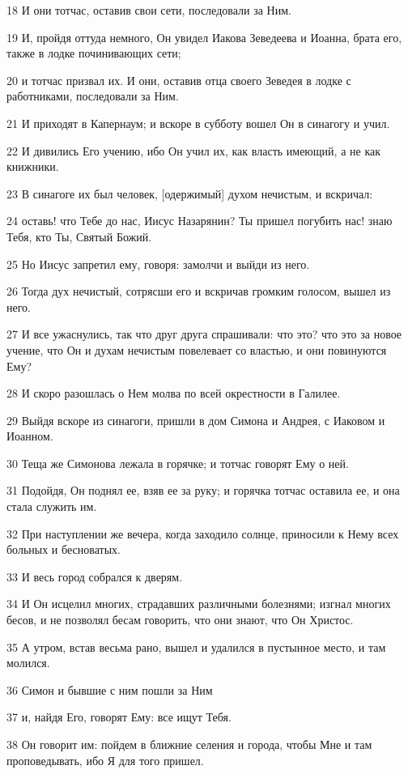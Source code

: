 \par 18 И они тотчас, оставив свои сети, последовали за Ним.
\par 19 И, пройдя оттуда немного, Он увидел Иакова Зеведеева и Иоанна, брата его, также в лодке починивающих сети;
\par 20 и тотчас призвал их. И они, оставив отца своего Зеведея в лодке с работниками, последовали за Ним.
\par 21 И приходят в Капернаум; и вскоре в субботу вошел Он в синагогу и учил.
\par 22 И дивились Его учению, ибо Он учил их, как власть имеющий, а не как книжники.
\par 23 В синагоге их был человек, [одержимый] духом нечистым, и вскричал:
\par 24 оставь! что Тебе до нас, Иисус Назарянин? Ты пришел погубить нас! знаю Тебя, кто Ты, Святый Божий.
\par 25 Но Иисус запретил ему, говоря: замолчи и выйди из него.
\par 26 Тогда дух нечистый, сотрясши его и вскричав громким голосом, вышел из него.
\par 27 И все ужаснулись, так что друг друга спрашивали: что это? что это за новое учение, что Он и духам нечистым повелевает со властью, и они повинуются Ему?
\par 28 И скоро разошлась о Нем молва по всей окрестности в Галилее.
\par 29 Выйдя вскоре из синагоги, пришли в дом Симона и Андрея, с Иаковом и Иоанном.
\par 30 Теща же Симонова лежала в горячке; и тотчас говорят Ему о ней.
\par 31 Подойдя, Он поднял ее, взяв ее за руку; и горячка тотчас оставила ее, и она стала служить им.
\par 32 При наступлении же вечера, когда заходило солнце, приносили к Нему всех больных и бесноватых.
\par 33 И весь город собрался к дверям.
\par 34 И Он исцелил многих, страдавших различными болезнями; изгнал многих бесов, и не позволял бесам говорить, что они знают, что Он Христос.
\par 35 А утром, встав весьма рано, вышел и удалился в пустынное место, и там молился.
\par 36 Симон и бывшие с ним пошли за Ним
\par 37 и, найдя Его, говорят Ему: все ищут Тебя.
\par 38 Он говорит им: пойдем в ближние селения и города, чтобы Мне и там проповедывать, ибо Я для того пришел.
